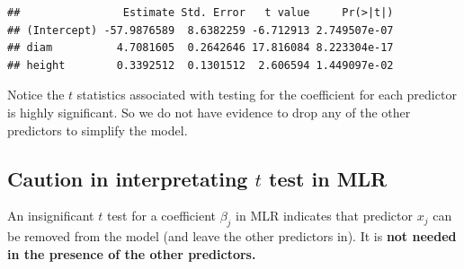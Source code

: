 \documentclass[
]{book}
\begin{document}
\begin{verbatim}
##                Estimate Std. Error   t value     Pr(>|t|)
## (Intercept) -57.9876589  8.6382259 -6.712913 2.749507e-07
## diam          4.7081605  0.2642646 17.816084 8.223304e-17
## height        0.3392512  0.1301512  2.606594 1.449097e-02
\end{verbatim}

Notice the \(t\) statistics associated with testing for the coefficient for each predictor is highly significant. So we do not have evidence to drop any of the other predictors to simplify the model.

\hypertarget{caution-in-interpretating-t-test-in-mlr}{%
\subsection{\texorpdfstring{Caution in interpretating \(t\) test in MLR}{Caution in interpretating t test in MLR}}\label{caution-in-interpretating-t-test-in-mlr}}

An insignificant \(t\) test for a coefficient \(\beta_j\) in MLR indicates that predictor \(x_j\) can be removed from the model (and leave the other predictors in). It is \textbf{not needed in the presence of the other predictors.}
\end{document}
